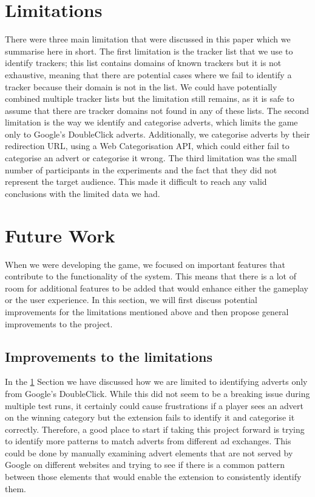\documentclass{l4proj}
\begin{document}
\section{Limitations}
\label{limitations}
There were three main limitation that were discussed in this paper which we summarise here in short. The first limitation is the tracker list that we use to identify trackers; this list contains domains of known trackers but it is not exhaustive, meaning that there are potential cases where we fail to identify a tracker because their domain is not in the list. We could have potentially combined multiple tracker lists but the limitation still remains, as it is safe to assume that there are tracker domains not found in any of these lists. The second limitation is the way we identify and categorise adverts, which limits the game only to Google's DoubleClick adverts. Additionally, we categorise adverts by their redirection URL, using a Web Categorisation API, which could either fail to categorise an advert or categorise it wrong. The third limitation was the small number of participants in the experiments and the fact that they did not represent the target audience. This made it difficult to reach any valid conclusions with the limited data we had.

\section{Future Work}
When we were developing the game, we focused on important features that contribute to the functionality of the system. This means that there is a lot of room for additional features to be added that would enhance either the gameplay or the user experience. In this section, we will first discuss potential improvements for the limitations mentioned above and then propose general improvements to the project.

\subsection{Improvements to the limitations}
In the \ref{limitations} Section we have discussed how we are limited to identifying adverts only from Google's DoubleClick. While this did not seem to be a breaking issue during multiple test runs, it certainly could cause frustrations if a player sees an advert on the winning category but the extension fails to identify it and categorise it correctly. Therefore, a good place to start if taking this project forward is trying to identify more patterns to match adverts from different ad exchanges. This could be done by manually examining advert elements that are not served by Google on different websites and trying to see if there is a common pattern between those elements that would enable the extension to consistently identify them. 
\end{document}
